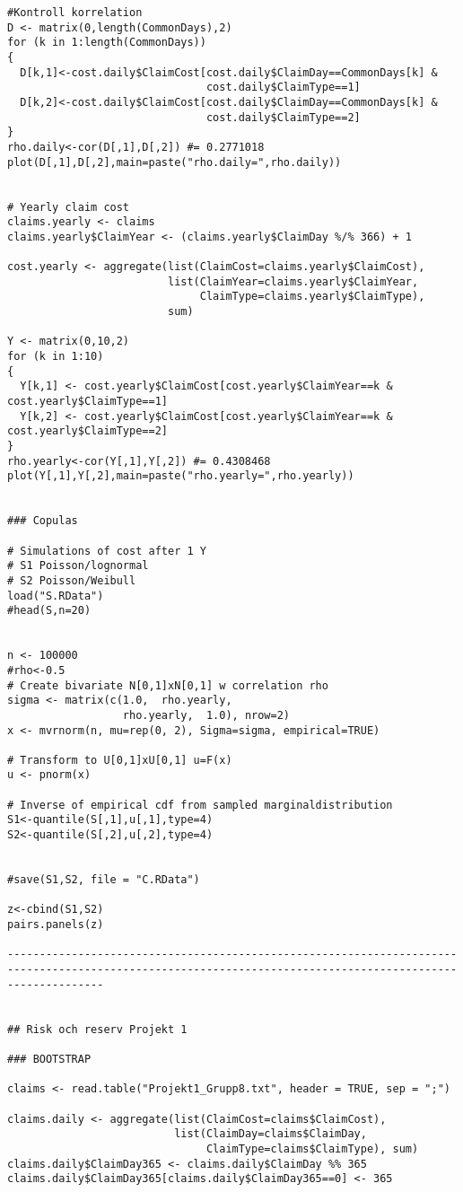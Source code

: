 \documentclass[11pt]{article}
\begin{document}
\begin{verbatim}
#Kontroll korrelation
D <- matrix(0,length(CommonDays),2)
for (k in 1:length(CommonDays))
{
  D[k,1]<-cost.daily$ClaimCost[cost.daily$ClaimDay==CommonDays[k] &
                               cost.daily$ClaimType==1]
  D[k,2]<-cost.daily$ClaimCost[cost.daily$ClaimDay==CommonDays[k] &
                               cost.daily$ClaimType==2]
}
rho.daily<-cor(D[,1],D[,2]) #= 0.2771018
plot(D[,1],D[,2],main=paste("rho.daily=",rho.daily))


# Yearly claim cost
claims.yearly <- claims
claims.yearly$ClaimYear <- (claims.yearly$ClaimDay %/% 366) + 1

cost.yearly <- aggregate(list(ClaimCost=claims.yearly$ClaimCost),
                         list(ClaimYear=claims.yearly$ClaimYear,
                              ClaimType=claims.yearly$ClaimType),
                         sum)

Y <- matrix(0,10,2)
for (k in 1:10)
{
  Y[k,1] <- cost.yearly$ClaimCost[cost.yearly$ClaimYear==k & cost.yearly$ClaimType==1]
  Y[k,2] <- cost.yearly$ClaimCost[cost.yearly$ClaimYear==k & cost.yearly$ClaimType==2]
}
rho.yearly<-cor(Y[,1],Y[,2]) #= 0.4308468
plot(Y[,1],Y[,2],main=paste("rho.yearly=",rho.yearly))


### Copulas

# Simulations of cost after 1 Y
# S1 Poisson/lognormal
# S2 Poisson/Weibull
load("S.RData")
#head(S,n=20)


n <- 100000
#rho<-0.5
# Create bivariate N[0,1]xN[0,1] w correlation rho
sigma <- matrix(c(1.0,  rho.yearly,
                  rho.yearly,  1.0), nrow=2)
x <- mvrnorm(n, mu=rep(0, 2), Sigma=sigma, empirical=TRUE)

# Transform to U[0,1]xU[0,1] u=F(x)
u <- pnorm(x)

# Inverse of empirical cdf from sampled marginaldistribution 
S1<-quantile(S[,1],u[,1],type=4)
S2<-quantile(S[,2],u[,2],type=4)


#save(S1,S2, file = "C.RData")

z<-cbind(S1,S2)
pairs.panels(z)

-----------------------------------------------------------------------------------------------------------------------------------------------------------


## Risk och reserv Projekt 1

### BOOTSTRAP

claims <- read.table("Projekt1_Grupp8.txt", header = TRUE, sep = ";")

claims.daily <- aggregate(list(ClaimCost=claims$ClaimCost),
                          list(ClaimDay=claims$ClaimDay,
                               ClaimType=claims$ClaimType), sum)
claims.daily$ClaimDay365 <- claims.daily$ClaimDay %% 365
claims.daily$ClaimDay365[claims.daily$ClaimDay365==0] <- 365


\end{verbatim}
\end{document}
